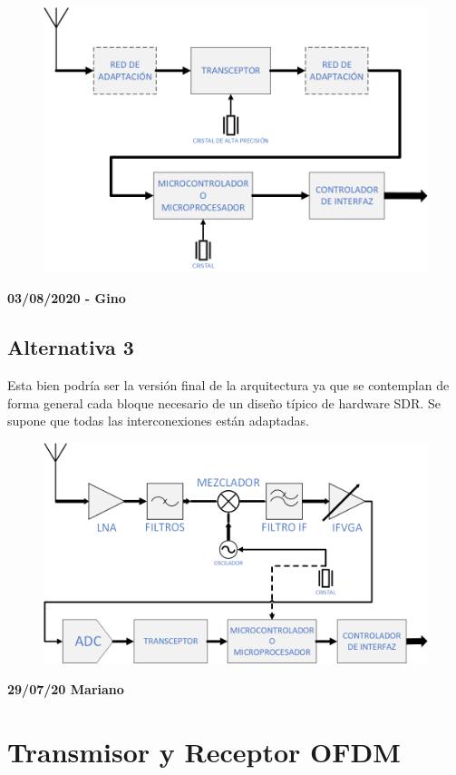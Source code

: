 \documentclass[a4paper,12pt]{report} %
\begin{document}
\begin{figure}[H]
	\centering
	\includegraphics[scale=0.6]{Imagenes/Arquitectura/diagrama2}
\end{figure}

\textbf{03/08/2020 - Gino}
\subsection{Alternativa 3}

Esta bien podría ser la versión final de la arquitectura ya que se contemplan de forma general cada bloque necesario de un diseño típico de hardware SDR. Se supone que todas las interconexiones están adaptadas.

\begin{figure}[H]
	\centering
	\includegraphics[scale=0.6]{Imagenes/Arquitectura/diagrama3}
\end{figure}

\textbf{29/07/20 Mariano}
\section{Transmisor y Receptor OFDM \cite{tesis}}
\end{document}
